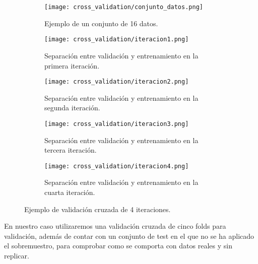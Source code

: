 \begin{figure}[H]
    \centering

	 \begin{subfigure}[b]{\textwidth}
		\centering
		\texttt{[image: cross\_validation/conjunto\_datos.png]}
		\caption{Ejemplo de un conjunto de 16 datos.}
	  \label{fig:ej_16_datos}
   \end{subfigure}
	\vspace{1cm}

	 \begin{subfigure}[b]{\textwidth}
		 \centering
		 \texttt{[image: cross\_validation/iteracion1.png]}
 		 \caption{Separación entre validación y entrenamiento en la primera iteración.}
 	    \label{fig:cv_iteracion1}
	 \end{subfigure}
	 \vspace{1cm}

	\begin{subfigure}[b]{\textwidth}
		 \centering
		 \texttt{[image: cross\_validation/iteracion2.png]}
 		 \caption{Separación entre validación y entrenamiento en la segunda iteración.}
 	    \label{fig:cv_iteracion2}
   \end{subfigure}
	\vspace{1cm}

	\begin{subfigure}[b]{\textwidth}
		 \centering
		 \texttt{[image: cross\_validation/iteracion3.png]}
 		 \caption{Separación entre validación y entrenamiento en la tercera iteración.}
 	    \label{fig:cv_iteracion3}
	\end{subfigure}
	\vspace{1cm}

	\begin{subfigure}[b]{\textwidth}
		 \centering
		 \texttt{[image: cross\_validation/iteracion4.png]}
 		 \caption{Separación entre validación y entrenamiento en la cuarta iteración.}
 	    \label{fig:cv_iteracion4}
	\end{subfigure}

	\caption{Ejemplo de validación cruzada de 4 iteraciones.}
	\label{fig:4-cv-ejemplo}
\end{figure}


En nuestro caso utilizaremos una validación cruzada de cinco folds para validación, además de contar con un conjunto de test en el que no se ha aplicado el sobremuestro, para comprobar como se comporta con datos reales y sin replicar.


